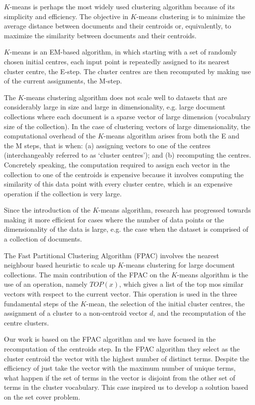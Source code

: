\documentclass[runningheads]{llncs}
\begin{document}
$K$-means is perhaps the most widely used clustering algorithm
because of its simplicity and efficiency. The objective in $K$-means clustering is to minimize the average distance between documents and their
centroids or, equivalently, to maximize the similarity between documents
and their centroids.

$K$-means is an EM-based algorithm, in which starting with a set of randomly 
chosen initial centres, each input point is repeatedly assigned to its
nearest cluster centre, the E-step. The cluster centres are then recomputed by making use of the current assignments, the M-step.


The $K$-means clustering algorithm
does not scale well to datasets that are considerably large in size
and large in dimensionality, e.g. large document collections where
each document is a sparse vector of large dimension (vocabulary
size of the collection).
In the case of clustering vectors of large
dimensionality, the computational overhead of the $K$-means algorithm arises from both the E and the M steps, that is when: (a)
assigning vectors to one of the centres (interchangeably referred to
as ‘cluster centres’); and (b) recomputing the centres. Concretely
speaking, the computation required to assign each vector in the
collection to one of the centroids is expensive because it involves
computing the similarity of this data point with every cluster centre, which is an expensive operation if the collection is very large.

Since the introduction of the $K$-means algorithm, research
has progressed towards making it more efficient for cases where
the number of data points or the dimensionality of the data is
large, e.g. the case when the dataset is comprised of a collection
of documents.

The Fast Partitional Clustering Algorithm (FPAC) \cite{ganguly_2018}
involves the nearest neighbour based heuristic to
scale up $K$-means clustering for large document collections.
The main contribution of the FPAC on the $K$-means algorithm
is the use of an operation, namely 
$TOP(x)$, which gives a list
of the top mos similar vectors with respect to the current vector.
This operation is used in the three fundamental steps of the 
$K$-mean, the selection of the initial cluster centres,
the assignment of a cluster to a non-centroid vector $d$, and 
the recomputation of the centre clusters.

Our work is based on the FPAC algorithm and we have focused in the recomputation of the centroids step.
In the FPAC algorithm they select as the cluster centroid the 
vector with the highest number of distinct terms. Despite the efficiency
of just take the vector with the maximum number of unique terms,
what happen if the set of terms in the vector is disjoint from 
the other set of terms in the cluster vocabulary. This 
case inspired us to develop a solution based on the set cover problem.
\end{document}
